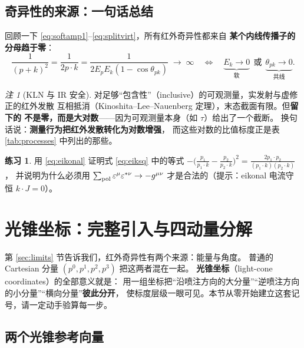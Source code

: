 \documentclass[UTF8,a4paper,11pt]{ctexart}
\theoremstyle{definition}
\newtheorem{exercise}{练习}[section]
\theoremstyle{remark}
\newtheorem{remark}{注}[section]
\theoremstyle{plain}
\newcommand{\en}[1]{\textsf{#1}}   %
\begin{document}
\subsection{奇异性的来源：一句话总结}

回顾一下 \eqref{eq:softamp1}--\eqref{eq:splitvirt}，所有红外奇异性都来自
\textbf{某个内线传播子的分母趋于零}：
\begin{equation}
  \frac{1}{(p+k)^2}=\frac{1}{2p\cdot k}
  =\frac{1}{2E_pE_k(1-\cos\theta_{pk})} \;\to\;\infty
  \quad\Longleftrightarrow\quad
  \underbrace{E_k\to0}_{\text{软}}
  \ \ \text{或}\ \
  \underbrace{\theta_{pk}\to0}_{\text{共线}} .
  \label{eq:irorigin}
\end{equation}

\begin{remark}[KLN 与 IR 安全]
对足够“包含性”（\en{inclusive}）的可观测量，实发射与虚修正的红外发散
互相抵消（Kinoshita--Lee--Nauenberg 定理），末态截面有限。但\textbf{留下的
不是零，而是大对数}——因为可观测量本身（如 $\tau$）给出了一个截断。
换句话说：\textbf{测量行为把红外发散转化为对数增强}，
而这些对数的比值标度正是表 \ref{tab:processes} 中列出的那些。
\end{remark}

\begin{exercise}
用 \eqref{eq:eikonal} 证明式 \eqref{eq:eiksq} 中的等式
$-\big(\frac{p_1}{p_1\cdot k}-\frac{p_2}{p_2\cdot k}\big)^2
=\frac{2p_1\cdot p_2}{(p_1\cdot k)(p_2\cdot k)}$，
并说明为什么必须用 $\sum_{\rm pol}\varepsilon^\mu\varepsilon^{*\nu}\to-g^{\mu\nu}$
才是合法的（提示：eikonal 电流守恒 $k\cdot J=0$）。
\end{exercise}

\section{光锥坐标：完整引入与四动量分解}
\label{sec:lightcone}

第 \ref{sec:limits} 节告诉我们，红外奇异性有两个来源：能量与角度。
普通的 Cartesian 分量 $(p^0,p^1,p^2,p^3)$ 把这两者混在一起。
\textbf{光锥坐标}（\en{light-cone coordinates}）的全部意义就是：
用一组坐标把“沿喷注方向的大分量”“逆喷注方向的小分量”“横向分量”\textbf{彼此分开}，
使标度层级一眼可见。本节从零开始建立这套记号，请一定动手验算每一步。

\subsection{两个光锥参考向量}
\end{document}
